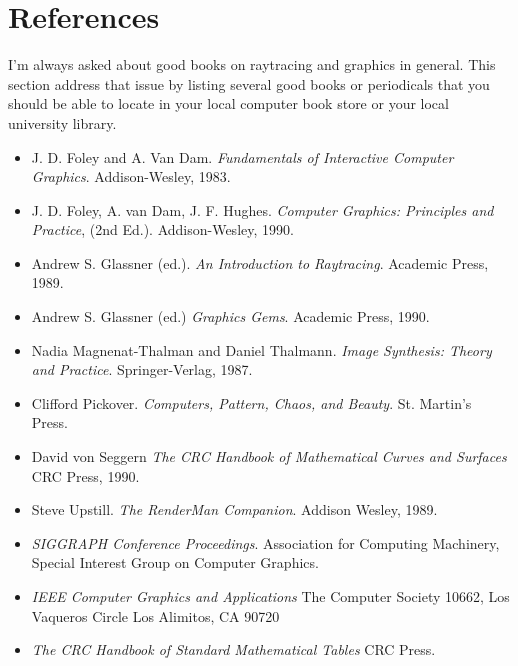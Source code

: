 \chapter{References}

I'm always asked about good books on raytracing and graphics in general.
This section address that issue by listing several good books or periodicals
that you should be able to locate in your local computer book store or your
local university library.

\begin{itemize}
\item J. D. Foley and A. Van Dam.
{\em Fundamentals of Interactive Computer Graphics}.
Addison-Wesley, 1983.

\item J. D. Foley, A. van Dam, J. F. Hughes.
{\em Computer Graphics:  Principles and Practice}, (2nd Ed.).
Addison-Wesley, 1990.

\item Andrew S. Glassner (ed.).
{\em An Introduction to Raytracing}.
Academic Press, 1989.

\item Andrew S. Glassner (ed.)
{\em Graphics Gems}.
Academic Press, 1990.

\item Nadia Magnenat-Thalman and Daniel Thalmann.
{\em Image Synthesis:  Theory and Practice}.
Springer-Verlag, 1987.

\item Clifford Pickover.
{\em Computers, Pattern, Chaos, and Beauty}.
St. Martin's Press.

\item David von Seggern
{\em The CRC Handbook of Mathematical Curves and Surfaces}
CRC Press, 1990.

\item Steve Upstill.
{\em The RenderMan Companion}.
Addison Wesley, 1989.

\item {\em SIGGRAPH Conference Proceedings}.
Association for Computing Machinery,
Special Interest Group on Computer Graphics.

\item {\em IEEE Computer Graphics and Applications}
The Computer Society
10662, Los Vaqueros Circle
Los Alimitos, CA 90720

\item {\em The CRC Handbook of Standard Mathematical Tables}
CRC Press.
\end{itemize}
